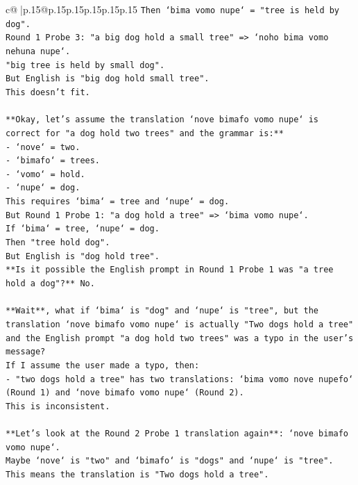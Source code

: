 \documentclass{article}
\begin{document}
{\begin{supertabular}{c@{$\;$}|p{.15\linewidth}@{}p{.15\linewidth}p{.15\linewidth}p{.15\linewidth}p{.15\linewidth}p{.15\linewidth}}
{{{\texttt{Then `bima vomo nupe` = "tree is held by dog".} \\
\texttt{Round 1 Probe 3: "a big dog hold a small tree" => `noho bima vomo nehuna nupe`.} \\
\texttt{"big tree is held by small dog".} \\
\texttt{But English is "big dog hold small tree".} \\
\texttt{This doesn't fit.} \\
\\ 
\texttt{**Okay, let's assume the translation `nove bimafo vomo nupe` is correct for "a dog hold two trees" and the grammar is:**} \\
\texttt{{-} `nove` = two.} \\
\texttt{{-} `bimafo` = trees.} \\
\texttt{{-} `vomo` = hold.} \\
\texttt{{-} `nupe` = dog.} \\
\texttt{This requires `bima` = tree and `nupe` = dog.} \\
\texttt{But Round 1 Probe 1: "a dog hold a tree" => `bima vomo nupe`.} \\
\texttt{If `bima` = tree, `nupe` = dog.} \\
\texttt{Then "tree hold dog".} \\
\texttt{But English is "dog hold tree".} \\
\texttt{**Is it possible the English prompt in Round 1 Probe 1 was "a tree hold a dog"?** No.} \\
\\ 
\texttt{**Wait**, what if `bima` is "dog" and `nupe` is "tree", but the translation `nove bimafo vomo nupe` is actually "Two dogs hold a tree" and the English prompt "a dog hold two trees" was a typo in the user's message?} \\
\texttt{If I assume the user made a typo, then:} \\
\texttt{{-} "two dogs hold a tree" has two translations: `bima vomo nove nupefo` (Round 1) and `nove bimafo vomo nupe` (Round 2).} \\
\texttt{This is inconsistent.} \\
\\ 
\texttt{**Let's look at the Round 2 Probe 1 translation again**: `nove bimafo vomo nupe`.} \\
\texttt{Maybe `nove` is "two" and `bimafo` is "dogs" and `nupe` is "tree".} \\
\texttt{This means the translation is "Two dogs hold a tree".} \\
}}}
\end{supertabular}}
\end{document}
